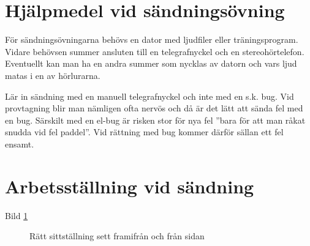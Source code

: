 \section{Hjälpmedel vid sändningsövning}

För sändningsövningarna behövs en dator med ljudfiler eller träningsprogram.
Vidare behövsen summer ansluten till en telegrafnyckel och en stereohörtelefon.
Eventuellt kan man ha en andra summer som nycklas av datorn och vars ljud matas
i en av hörlurarna.

Lär in sändning med en manuell telegrafnyckel och inte med en s.k. bug. Vid
provtagning blir man nämligen ofta nervös och då är det lätt att sända fel med
en bug. Särskilt med en el-bug är risken stor för nya fel ''bara för att man
råkat snudda vid fel paddel''.  Vid rättning med bug kommer därför sällan ett fel
ensamt.

\section{Arbetsställning vid sändning}

Bild \ref{fig:bild_morse_3_4}

\begin{figure}
  \caption{Rätt sittställning sett framifrån och från sidan}
  \label{fig:bild_morse_3_4}
\end{figure}

